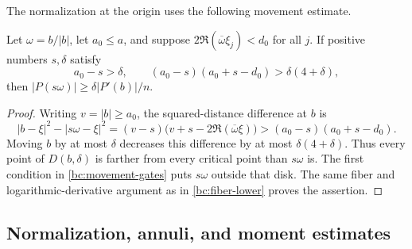 The normalization at the origin uses the following movement estimate.

\begin{lemma}\label{bc:movement}
Let $\omega=b/|b|$, let $a_0\leq a$, and suppose
$2\Re(\overline\omega\xi_j)<d_0$ for all $j$.  If positive numbers
$s,\delta$ satisfy
\begin{equation}\label{bc:movement-gates}
 a_0-s>\delta,\qquad
 (a_0-s)(a_0+s-d_0)>\delta(4+\delta),
\end{equation}
then $|P(s\omega)|\geq\delta|P'(b)|/n$.
\end{lemma}

\begin{proof}
Writing $v=|b|\geq a_0$, the squared-distance difference at $b$ is
\[
 |b-\xi|^2-|s\omega-\xi|^2
 =(v-s)\bigl(v+s-2\Re(\overline\omega\xi)\bigr)
 >(a_0-s)(a_0+s-d_0).
\]
Moving $b$ by at most $\delta$ decreases this difference by at most
$\delta(4+\delta)$.  Thus every point of $D(b,\delta)$ is farther
from every critical point than $s\omega$ is.  The first condition in
\eqref{bc:movement-gates} puts $s\omega$ outside that disk.  The same
fiber and logarithmic-derivative argument as in
\eqref{bc:fiber-lower} proves the assertion.
\end{proof}

\subsection{Normalization, annuli, and moment estimates}

